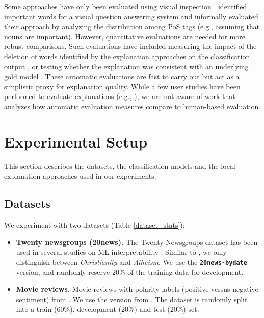 \documentclass[11pt,a4paper]{article}
\begin{document}
Some  approaches have only been evaluated using visual inspection \cite{ding-EtAl:2017:Long,li-EtAl:2016:N16-12}.
\citet{DBLP:journals/corr/GoyalMPB16} identified  important words for a  visual question answering system and informally evaluated their approach by analyzing the distribution among PoS tags (e.g., assuming that nouns are  important).
However, quantitative evaluations are needed for more robust comparisons. 
Such evaluations have included measuring the impact of the deletion of  words identified by the  explanation approaches on the classification output \cite{arras2016explaining,DBLP:journals/corr/ArrasHMMS16a},
or testing whether the explanation was consistent with an underlying gold model  \cite{Ribeiro:2016:WIT:2939672.2939778}. These automatic evaluations are fast to carry out but act as a simplistic proxy for explanation quality. While a few user studies have been performed to evaluate explanations (e.g., \citet{Ribeiro:2016:WIT:2939672.2939778}), we are not aware of work that analyzes how  automatic evaluation measures  compare to human-based evaluation.







 

\section{Experimental Setup}
\label{experimental_setup}
This section describes the datasets, the classification models and the local explanation approaches used in our experiments.
\subsection{Datasets}
We experiment with two  datasets (Table \ref{dataset_stats}): 
\begin{itemize}

\item \textbf{Twenty newsgroups (20news).}
The Twenty Newsgroups dataset  has been used in several studies on  ML interpretability \cite{arras2016explaining,Kapoor:2010:IOS:1753326.1753529,Ribeiro:2016:WIT:2939672.2939778}.
Similar to \citet{Ribeiro:2016:WIT:2939672.2939778}, we only  distinguish between \textit{Christianity} and \textit{Atheism}. We use the \texttt{\textbf{20news-bydate}} version, and randomly  reserve 20\% of the training data for development.


\item \textbf{Movie reviews.}
Movie reviews with polarity labels (positive versus negative sentiment) from \citet{Pang+Lee:04a}.
We use the version from \citet{zaidan-eisner-piatko:2007:main}. 
The dataset is randomly split into a  train (60\%), development (20\%) and test (20\%) set.



\end{itemize}
\end{document}
